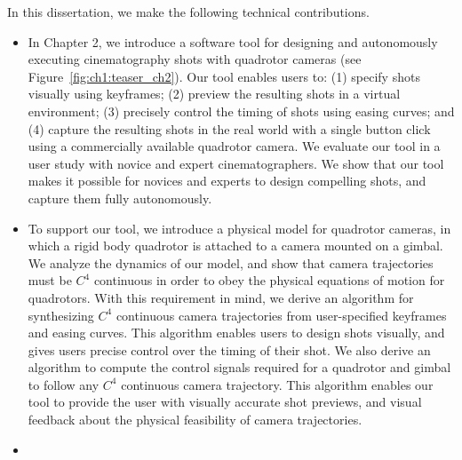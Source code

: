 In this dissertation, we make the following technical contributions.

\begin{itemize}

\item

In Chapter 2, we introduce a software tool for designing and autonomously executing cinematography shots with quadrotor cameras (see Figure~\ref{fig:ch1:teaser_ch2}).
Our tool enables users to: (1) specify shots visually using keyframes; (2) preview the resulting shots in a virtual environment; (3) precisely control the timing of shots using easing curves; and (4) capture the resulting shots in the real world with a single button click using a commercially available quadrotor camera.
We evaluate our tool in a user study with novice and expert cinematographers.
We show that our tool makes it possible for novices and experts to design compelling shots, and capture them fully autonomously.

\item 

To support our tool, we introduce a physical model for quadrotor cameras, in which a rigid body quadrotor is attached to a camera mounted on a gimbal.
We analyze the dynamics of our model, and show that camera trajectories must be $C^4$ continuous in order to obey the physical equations of motion for quadrotors.
With this requirement in mind, we derive an algorithm for synthesizing $C^4$ continuous camera trajectories from user-specified keyframes and easing curves.
This algorithm enables users to design shots visually, and gives users precise control over the timing of their shot.
We also derive an algorithm to compute the control signals required for a quadrotor and gimbal to follow any $C^4$ continuous camera trajectory.
This algorithm enables our tool to provide the user with visually accurate shot previews, and visual feedback about the physical feasibility of camera trajectories.

\item


\end{itemize}
